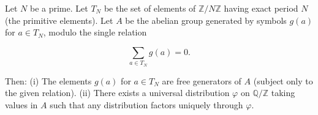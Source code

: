 Let $N$ be a prime. Let $T_N$ be the set of elements of $\mathbb{Z}/N\mathbb{Z}$ having
exact period $N$ (the primitive elements). Let $A$ be the abelian group generated by
symbols $g(a)$ for $a \in T_N$, modulo the single relation

$$\sum_{a \in T_N} g(a) = 0.$$

Then:
(i) The elements $g(a)$ for $a \in T_N$ are free generators of $A$ (subject only to
the given relation).
(ii) There exists a universal distribution $\varphi$ on $\mathbb{Q}/\mathbb{Z}$ taking
values in $A$ such that any distribution factors uniquely through $\varphi$.
